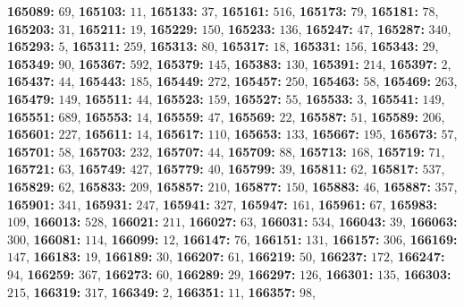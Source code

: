 \textsf{\bfseries 165089:} $69$, \textsf{\bfseries 165103:} $11$, \textsf{\bfseries 165133:} $37$, \textsf{\bfseries 165161:} $516$, \textsf{\bfseries 165173:} $79$, \textsf{\bfseries 165181:} $78$, \textsf{\bfseries 165203:} $31$, \textsf{\bfseries 165211:} $19$, \textsf{\bfseries 165229:} $150$, \textsf{\bfseries 165233:} $136$, \textsf{\bfseries 165247:} $47$, \textsf{\bfseries 165287:} $340$, \textsf{\bfseries 165293:} $5$, \textsf{\bfseries 165311:} $259$, \textsf{\bfseries 165313:} $80$, \textsf{\bfseries 165317:} $18$, \textsf{\bfseries 165331:} $156$, \textsf{\bfseries 165343:} $29$, \textsf{\bfseries 165349:} $90$, \textsf{\bfseries 165367:} $592$, \textsf{\bfseries 165379:} $145$, \textsf{\bfseries 165383:} $130$, \textsf{\bfseries 165391:} $214$, \textsf{\bfseries 165397:} $2$, \textsf{\bfseries 165437:} $44$, \textsf{\bfseries 165443:} $185$, \textsf{\bfseries 165449:} $272$, \textsf{\bfseries 165457:} $250$, \textsf{\bfseries 165463:} $58$, \textsf{\bfseries 165469:} $263$, \textsf{\bfseries 165479:} $149$, \textsf{\bfseries 165511:} $44$, \textsf{\bfseries 165523:} $159$, \textsf{\bfseries 165527:} $55$, \textsf{\bfseries 165533:} $3$, \textsf{\bfseries 165541:} $149$, \textsf{\bfseries 165551:} $689$, \textsf{\bfseries 165553:} $14$, \textsf{\bfseries 165559:} $47$, \textsf{\bfseries 165569:} $22$, \textsf{\bfseries 165587:} $51$, \textsf{\bfseries 165589:} $206$, \textsf{\bfseries 165601:} $227$, \textsf{\bfseries 165611:} $14$, \textsf{\bfseries 165617:} $110$, \textsf{\bfseries 165653:} $133$, \textsf{\bfseries 165667:} $195$, \textsf{\bfseries 165673:} $57$, \textsf{\bfseries 165701:} $58$, \textsf{\bfseries 165703:} $232$, \textsf{\bfseries 165707:} $44$, \textsf{\bfseries 165709:} $88$, \textsf{\bfseries 165713:} $168$, \textsf{\bfseries 165719:} $71$, \textsf{\bfseries 165721:} $63$, \textsf{\bfseries 165749:} $427$, \textsf{\bfseries 165779:} $40$, \textsf{\bfseries 165799:} $39$, \textsf{\bfseries 165811:} $62$, \textsf{\bfseries 165817:} $537$, \textsf{\bfseries 165829:} $62$, \textsf{\bfseries 165833:} $209$, \textsf{\bfseries 165857:} $210$, \textsf{\bfseries 165877:} $150$, \textsf{\bfseries 165883:} $46$, \textsf{\bfseries 165887:} $357$, \textsf{\bfseries 165901:} $341$, \textsf{\bfseries 165931:} $247$, \textsf{\bfseries 165941:} $327$, \textsf{\bfseries 165947:} $161$, \textsf{\bfseries 165961:} $67$, \textsf{\bfseries 165983:} $109$, \textsf{\bfseries 166013:} $528$, \textsf{\bfseries 166021:} $211$, \textsf{\bfseries 166027:} $63$, \textsf{\bfseries 166031:} $534$, \textsf{\bfseries 166043:} $39$, \textsf{\bfseries 166063:} $300$, \textsf{\bfseries 166081:} $114$, \textsf{\bfseries 166099:} $12$, \textsf{\bfseries 166147:} $76$, \textsf{\bfseries 166151:} $131$, \textsf{\bfseries 166157:} $306$, \textsf{\bfseries 166169:} $147$, \textsf{\bfseries 166183:} $19$, \textsf{\bfseries 166189:} $30$, \textsf{\bfseries 166207:} $61$, \textsf{\bfseries 166219:} $50$, \textsf{\bfseries 166237:} $172$, \textsf{\bfseries 166247:} $94$, \textsf{\bfseries 166259:} $367$, \textsf{\bfseries 166273:} $60$, \textsf{\bfseries 166289:} $29$, \textsf{\bfseries 166297:} $126$, \textsf{\bfseries 166301:} $135$, \textsf{\bfseries 166303:} $215$, \textsf{\bfseries 166319:} $317$, \textsf{\bfseries 166349:} $2$, \textsf{\bfseries 166351:} $11$, \textsf{\bfseries 166357:} $98$, 
